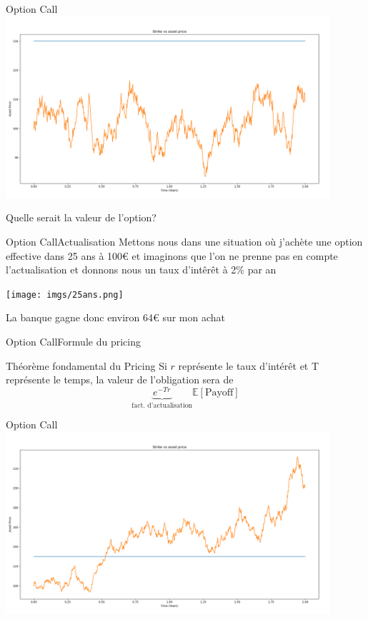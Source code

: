 \documentclass{beamer}
\newcommand{\1}{\mathmybb{1}}
\begin{document}
\begin{frame}{Option Call}
  \includegraphics[width=12cm]{imgs/nostrike.png}
\end{frame}
\begin{frame}
  \begin{alertblock}{}
    \begin{center}
      Quelle serait la valeur de l'option?
      \end{center}
  \end{alertblock}
\end{frame}
\begin{frame}{Option Call}{Actualisation}
  Mettons nous dans une situation où j'achète une option effective dans 25 ans à 100€ et imaginons que l'on ne prenne pas en compte l'actualisation et donnons nous un taux d'intêrêt à 2\% par an
  \pause
  \begin{center}
    \texttt{[image: imgs/25ans.png]}
    \end{center}
  La banque gagne donc environ 64€ sur mon achat
\end{frame}
\begin{frame}{Option Call}{Formule du pricing}
\begin{block}{Théorème fondamental du Pricing}
 Si $r$ représente le taux d'intérêt et T représente le temps, la valeur de l'obligation sera de
    \begin{equation} \label{tfp}
      \underbrace{e^{-Tr}}_{\text{fact. d'actualisation}}\mathbb{E}\left[ \text{Payoff} \right]
    \end{equation}
  \end{block}
\end{frame}
\begin{frame}{Option Call}
  \includegraphics[width=12cm]{imgs/strike.png}
\end{frame}
\end{document}
